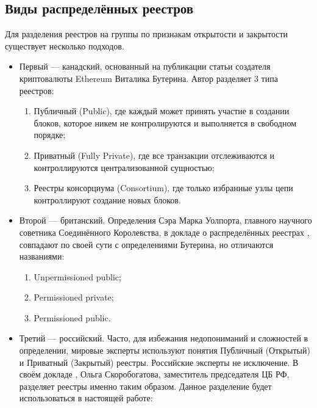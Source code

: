 \subsection{Виды распределённых реестров}\label{kinds_reestrs}
Для разделения реестров на группы по признакам открытости и закрытости
существует несколько подходов.
\begin{itemize}
    \item Первый --- канадский, основанный на публикации статьи
        \cite{VitalikButerin2015} создателя криптовалюты Ethereum Виталика
        Бутерина. Автор разделяет 3 типа реестров:
          \begin{enumerate}
              \item Публичный (Public), где каждый может принять участие в
                  создании блоков, которое никем не контролируются и
                  выполняется в свободном порядке;
              \item Приватный (Fully Private), где все транзакции отслеживаются
                  и контроллируются централизованной сущностью;
              \item Реестры консорциума (Consortium), где только избранные узлы
                  цепи контроллируют создание новых блоков.
          \end{enumerate}
     \item Второй --- британский. Определения Сэра Марка Уолпорта, главного
         научного советника Соединённого Королевства, в докладе о
         распределённых реестрах \cite{DeLeon2018}, совпадают по своей сути с определениями
         Бутерина, но отличаются названиями:
         \begin{enumerate}
                 \item Unpermissioned public;
                 \item Permissioned private;
                 \item Permissioned public.
         \end{enumerate}
     \item Третий --- российский. Часто, для избежания недопониманий и
         сложностей в определении, мировые эксперты используют понятия
         Публичный (Открытый) и Приватный (Закрытый) реестры. Российские
         эксперты не исключение. В своём докладе \cite{2016}, Ольга Скоробогатова,
         заместитель председателя ЦБ РФ, разделяет реестры именно таким
         образом. Данное разделение будет использоваться в настоящей работе:
         \begin{enumerate}

\end{enumerate}
\end{itemize}
